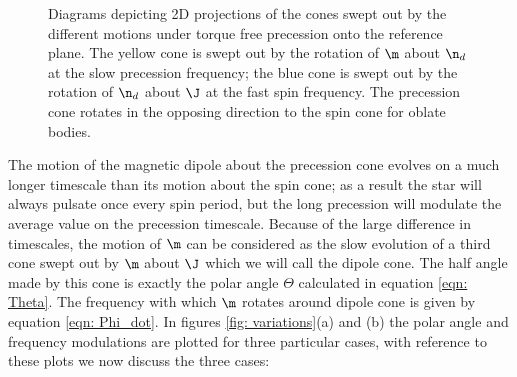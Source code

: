 \documentclass[/home/greg/Thesis/main/main.tex]{subfiles}
\begin{document}
\graphicspath{{/home/greg/Neutron_star_modelling/Illustrations/Cones/}}
\begin{figure}[ht]
\centering
\caption{Diagrams depicting 2D projections of the cones swept out by the
    different motions under torque free precession onto the reference plane.
    The yellow cone is swept out by the rotation of $\m$ about $\n_{d}$ at the
    slow precession frequency; the blue cone is swept out by the rotation of
    $\n_{d}$ about $\J$ at the fast spin frequency. The
precession cone rotates in the opposing direction to the spin cone for oblate
bodies.}
\label{fig: cones}
\end{figure}
\graphicspath{{/home/greg/Neutron_star_modelling/TimingNoiseModels/Observables_NoTorque/img/}}

The motion of the magnetic dipole about the precession cone evolves on a much
longer timescale than its motion about the spin cone; as a result the star will
always pulsate once every spin period, but the long precession will modulate
the average value on the precession timescale. Because of the large difference
in timescales, the motion of $\m$ can be considered as the slow evolution of a
third cone swept out by $\m$ about $\J$ which we will call the dipole cone. The
half angle made by this cone is exactly the polar angle $\Theta$ calculated
in equation \eqref{eqn: Theta}. The frequency with which $\m$ rotates around
dipole cone is given by equation \eqref{eqn: Phi_dot}. In figures \ref{fig:
variations}(a) and (b) the polar angle and frequency modulations are plotted for
three particular cases, with reference to these plots we now discuss the three
cases:
\end{document}
